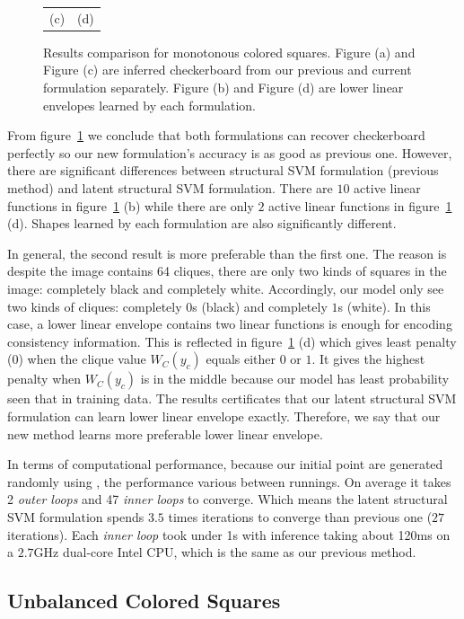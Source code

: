 \begin{figure}[ht]
\begin{tabular}{cc}
    {\small (c)} & {\small (d)} 
  \end{tabular}
  \caption{\label{fig:mono_results} Results comparison for
    monotonous colored squares. Figure (a) and Figure (c) are
    inferred checkerboard from our previous and current
    formulation separately. Figure (b) and Figure (d) are lower
    linear envelopes learned by each formulation.}
\end{figure}

From figure~\ref{fig:mono_results} we conclude that both
formulations can recover checkerboard perfectly so our new
formulation's accuracy is as good as previous one. However,
there are significant differences between structural SVM
formulation (previous method) and latent structural SVM
formulation. There are $10$ active linear functions in
figure~\ref{fig:mono_results} (b) while there are only $2$ active
linear functions in figure~\ref{fig:mono_results} (d). Shapes
learned by each formulation are also significantly different.

In general, the second result is more preferable than the first
one. The reason is despite the image contains 64 cliques, there
are only two kinds of squares in the image: completely black and
completely white. Accordingly, our model only see two kinds of
cliques: completely $0$s (black) and completely $1$s (white). In
this case, a lower linear envelope contains two linear functions
is enough for encoding consistency information. This is reflected
in figure~\ref{fig:mono_results} (d) which gives least penalty
(0) when the clique value $W_C(y_c)$ equals either $0$ or $1$. It
gives the highest penalty when $W_C(y_c)$ is in the middle
because our model has least probability seen that in training
data. The results certificates that our latent structural SVM
formulation can learn lower linear envelope exactly. Therefore,
we say that our new method learns more preferable lower linear
envelope.

In terms of computational performance, because our initial point
are generated randomly using , the
performance various between runnings. On average it takes 2
\emph{outer loops} and 47 \emph{inner loops} to converge. Which
means the latent structural SVM formulation spends $3.5$ times
iterations to converge than previous one ($27$ iterations).
Each \emph{inner loop} took under 1s with inference taking about
120ms on a $2.7$GHz dual-core Intel CPU, which is the same as our
previous method.



\subsection{Unbalanced Colored Squares}
\label{sec:unbal-color-squar}

